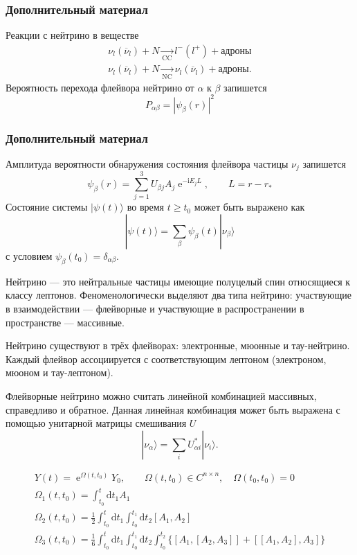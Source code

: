 \documentclass[utf8,9pt,mathserif,usepdftitle=false]{beamer}
\newcommand{\dd}{\mathrm{d}}
\renewcommand{\exp}{\operatorname{e}}
\renewcommand{\imath}{\mathrm{i}}
\begin{document}
\begin{frame}
  \frametitle{Дополнительный материал}%
  Реакции с нейтрино в веществе
  \begin{align*}
    \nu_{l}(\overline{\nu}_{l})+N\xrightarrow[\text{CC}]{}l^{-}(l^{+})+\text{адроны}\\[2ex]
    \nu_{l}(\overline{\nu}_{l})+N\xrightarrow[\text{NC}]{}\nu_{l}(\overline{\nu}_{l})+\text{адроны}.
  \end{align*}
  	Вероятность перехода флейвора нейтрино от \(\alpha\) к \(\beta\) запишется
  \begin{equation}
  	P_{\alpha \beta}=|\psi_{\beta}(r)|^{2}
  \end{equation}
\end{frame}
\begin{frame}
  \frametitle{Дополнительный материал}
  Амплитуда вероятности обнаружения состояния флейвора частицы \(\nu_{j}\) запишется
  \begin{equation}
  	\psi_{\beta}(r)=\sum_{j=1}^{3}U_{\beta j}A_{j}\exp^{-\imath E_{j}L}, \qquad L=r-r_{*}
  \end{equation}
  Состояние системы \(|\psi(t)\rangle\) во время \(t \geqslant t_{0}\) может быть выражено как
  \begin{equation}
  	|\psi(t)\rangle=\sum_{\beta}\psi_{\beta}(t)|\nu_{\beta}\rangle
  \end{equation}
  с условием \(\psi_{\beta}(t_{0})=\delta_{\alpha \beta}\).
  
   Нейтрино — это нейтральные частицы имеющие полуцелый спин относящиеся к классу
  лептонов. Феноменологически выделяют два типа нейтрино: участвующие в
  взаимодействии — флейворные и участвующие в распространении в пространстве —
  массивные.
  
  Нейтрино существуют в трёх флейворах: электронные, мюонные и
  тау-нейтрино. Каждый флейвор ассоциируется с соответствующим лептоном
  (электроном, мюоном и тау-лептоном).
  
  Флейворные нейтрино можно считать линейной комбинацией массивных, справедливо и 
  обратное. Данная линейная комбинация может быть выражена с помощью унитарной
  матрицы смешивания \(U\)
  \begin{equation}
  	|\nu_{\alpha}\rangle=\sum_{i}U_{\alpha i}^{*}|\nu_{i}\rangle.
  \end{equation}
  \end{frame}
  \begin{frame}
 \begin{align}
 	Y(t)=\exp^{\Omega(t,t_{0})}Y_{0}, \qquad \Omega(t,t_{0})\in C^{n\times n},\quad 
 	\Omega(t_{0},t_{0})=0\\
 	\Omega_{1}(t,t_{0})=\int_{t_{0}}^{t}\dd t_{1}A_{1}\\
 	\Omega_{2}(t,t_{0})=\frac{1}{2}\int_{t_{0}}^{t}\dd t_{1}\int_{t_{0}}^{t_{1}}\dd t_{2}[A_{1},A_{2}]\\
 	\Omega_{3}(t,t_{0})=\frac{1}{6}\int_{t_{0}}^{t}\dd t_{1}\int_{t_{0}}^{t_{1}}\dd 
 	t_{2}\int_{t_{0}}^{t_{2}}\{[A_{1},[A_{2},A_{3}]]+[[A_{1},A_{2}],A_{3}]\}
 \end{align}
  
\end{frame}
\end{document}
